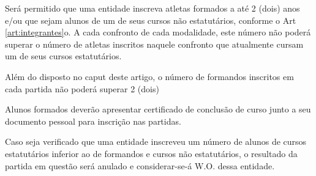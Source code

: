 \begin{article}
	Será permitido que uma entidade inscreva atletas formados a até 2 (dois) anos e/ou que sejam alunos de um de seus cursos não estatutários, conforme o Art \ref{art:integrantes}o. A cada confronto de cada modalidade, este número não poderá superar o número de atletas inscritos naquele confronto que atualmente cursam um de seus cursos estatutários.

	\begin{xparagraph}
		Além do disposto no caput deste artigo, o número de formandos inscritos em cada partida não poderá superar 2 (dois)
	\end{xparagraph}

	\begin{xparagraph}
	    Alunos formados deverão apresentar certificado de conclusão de curso junto a seu documento pessoal para inscrição nas partidas.
	\end{xparagraph}

	\begin{xparagraph}
		Caso seja verificado que uma entidade inscreveu um número de alunos de cursos estatutários inferior ao de formandos e cursos não estatutários, o resultado da partida em questão será anulado e considerar-se-á W.O. dessa entidade.
	\end{xparagraph}
\end{article}
